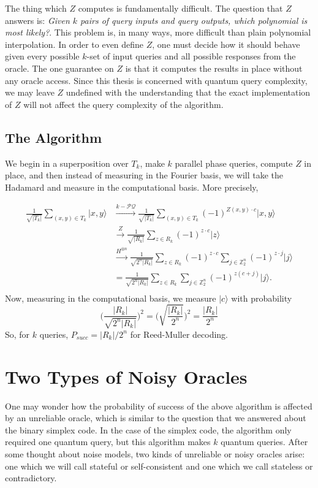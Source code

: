 \documentclass[12pt,twoside]{reedthesis}
\theoremstyle{definition}
\newcommand{\Z}{\mathbb{Z}}
\newcommand{\ket}[1]{\ensuremath{\lvert #1\rangle}\xspace}
\begin{document}
The thing which $Z$ computes is fundamentally difficult. The question that $Z$ answers is: \textit{Given $k$ pairs of query inputs and query outputs, which polynomial is most likely?}. This problem is, in many ways, more difficult than plain polynomial interpolation. In order to even define $Z$, one must decide how it should behave given every possible $k$-set of input queries and all possible responses from the oracle. The one guarantee on $Z$ is that it computes the results in place without any oracle access. Since this thesis is concerned with quantum query complexity, we may leave $Z$ undefined with the understanding that the exact implementation of $Z$ will not affect the query complexity of the algorithm.

\subsection{The Algorithm}
We begin in a superposition over $T_k$, make $k$ parallel phase queries, compute $Z$ in place, and then instead of  measuring in the Fourier basis, we will take the Hadamard and measure in the computational basis. More precisely,

\begin{align*}
\frac{1}{\sqrt{\lvert T_k \rvert}} \sum_{(x,y) \in T_k} \ket{x,y}
& \xrightarrow{k-\mathcal{PQ}} \frac{1}{\sqrt{\lvert T_k \rvert}} \sum_{(x,y) \in T_k}  (-1)^{Z(x,y) \cdot c} \ket{x,y} \\
& \xrightarrow{Z} \frac{1}{\sqrt{\lvert R_k \rvert}} \sum_{z \in R_k} (-1)^{z\cdot c} \ket{z} \\
& \xrightarrow{H^{\otimes n}} \frac{1}{\sqrt{2^n \lvert R_k \rvert}} \sum_{z \in R_k} (-1)^{z \cdot c} \sum_{j \in \Z_2^n} (-1)^{z \cdot j} \ket{j} \\
& = \frac{1}{\sqrt{2^n \lvert R_k \rvert}}  \sum_{z \in R_k} \sum_{j \in \Z_2^n}(-1)^{z(c + j)}\ket{j}. \\
\end{align*}
Now, measuring in the computational basis, we measure $\ket{c}$ with probability 
\begin{equation*}
\bigg(\frac{\lvert R_k \rvert}{\sqrt{2^n \lvert R_k \rvert}}\bigg )^2 = \bigg (\sqrt{\frac{\lvert R_k \rvert}{2^n}} \bigg)^2 = \frac{\lvert R_k \rvert}{2^n}
\end{equation*}
So, for $k$ queries, $P_{succ} = \lvert R_k \rvert /2^n$ for Reed-Muller decoding.
\section{Two Types of Noisy Oracles}
One may wonder how the probability of success of the above algorithm is affected by an unreliable oracle, which is similar to the question that we answered about the binary simplex code. In the case of the simplex code, the algorithm only required one quantum query, but this algorithm makes $k$ quantum queries. After some thought about noise models, two kinds of unreliable or noisy oracles arise: one which we will call stateful or self-consistent and one which we call stateless or contradictory.
\end{document}
